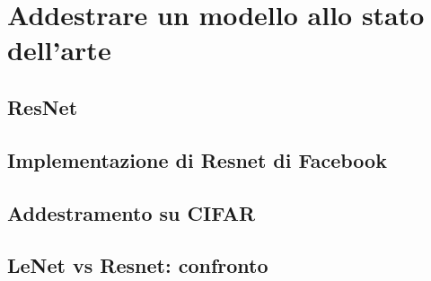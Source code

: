 
\chapter{Addestrare un modello allo stato dell'arte} %

\label{Capitolo4} %


\section{ResNet}



\section{Implementazione di Resnet di Facebook}




\section{Addestramento su CIFAR}

\section{LeNet vs Resnet: confronto}




